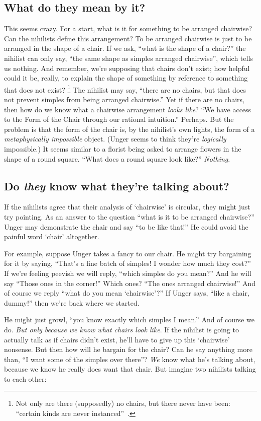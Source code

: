 \subsection{What do they mean by it?}
This seems crazy. For a start, what is it for something to be arranged chairwise? Can the nihilists define this arrangement? To be arranged chairwise is just to be arranged in the shape of a chair. If we ask, ``what is the shape of a chair?'' the nihilist can only say, ``the same shape as simples arranged chairwise'', which tells us nothing. And remember, we're supposing that chairs don't exist; how helpful could it be, really, to explain the shape of something by reference to something that does not exist?%
%
\footnote{Not only are there (supposedly) no chairs, but there never have been: ``certain kinds are never instanced''~\citep[147]{unger1979}.}%
The nihilist may say, ``there are no chairs, but that does not prevent simples from being arranged chairwise.'' Yet if there are no chairs, then how do we know what a chairwise arrangement {\em looks like}? ``We have access to the Form of the Chair through our rational intuition.'' Perhaps. But the problem is that the form of the chair is, by the nihilist's own lights, the form of a {\em metaphysically impossible} object. (Unger seems to think they're {\em logically} impossible.) It seems similar to a florist being asked to arrange flowers in the shape of a round square. ``What does a round square look like?'' {\em Nothing}.

\subsection{Do {\em they} know what they're talking about?}
If the nihilists agree that their analysis of `chairwise' is circular, they might just try pointing. As an answer to the question ``what is it to be arranged chairwise?'' Unger may demonstrate the chair and say ``to be like that!'' He could avoid the painful word `chair' altogether.

For example, suppose Unger takes a fancy to our chair. He might try bargaining for it by saying, ``That's a fine batch of simples! I wonder how much they cost?'' If we're feeling peevish we will reply, ``which simples do you mean?'' And he will say ``Those ones in the corner!'' Which ones? ``The ones arranged chairwise!'' And of course we reply ``what do you mean `chairwise'?'' If Unger says, ``like a chair, dummy!'' then we're back where we started.

He might just growl, ``you know exactly which simples I mean.'' And of course we do. {\em But only because we know what chairs look like}. If the nihilist is going to actually talk as if chairs didn't exist, he'll have to give up this `chairwise' nonsense. But then how will he bargain for the chair? Can he say anything more than, ``I want some of the simples over there''? {\em We} know what he's talking about, because we know he really does want that chair. But imagine two nihilists talking to each other:

